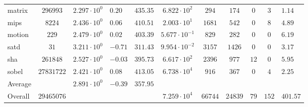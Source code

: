\begin{tabular}{|l|c|HHc|c|c|c|c|cH|}
matrix        & $ 296993   $ & $ 2.297 \cdot 10^{0} $ & $ 0.20  $ & $ 435.35 $ & $ 6.822 \cdot 10^{2}  $ & $ 294   $ & $ 174   $ & $ 0   $ & $ 3   $ & $ 1.14    $ \\
mips          & $ 8224     $ & $ 2.436 \cdot 10^{0} $ & $ 0.06  $ & $ 410.51 $ & $ 2.003 \cdot 10^{1}  $ & $ 1681  $ & $ 542   $ & $ 0   $ & $ 8   $ & $ 4.89    $ \\
motion        & $ 229      $ & $ 2.479 \cdot 10^{0} $ & $ 0.02  $ & $ 403.39 $ & $ 5.677 \cdot 10^{-1} $ & $ 829   $ & $ 282   $ & $ 0   $ & $ 0   $ & $ 6.19    $ \\
satd          & $ 31       $ & $ 3.211 \cdot 10^{0} $ & $ -0.71 $ & $ 311.43 $ & $ 9.954 \cdot 10^{-2} $ & $ 3157  $ & $ 1426  $ & $ 0   $ & $ 0   $ & $ 3.17    $ \\
sha           & $ 261848   $ & $ 2.527 \cdot 10^{0} $ & $ -0.03 $ & $ 395.73 $ & $ 6.617 \cdot 10^{2}  $ & $ 2396  $ & $ 977   $ & $ 12  $ & $ 0   $ & $ 5.95    $ \\
sobel         & $ 27831722 $ & $ 2.421 \cdot 10^{0} $ & $ 0.08  $ & $ 413.05 $ & $ 6.738 \cdot 10^{4}  $ & $ 916   $ & $ 367   $ & $ 0   $ & $ 4   $ & $ 2.25    $ \\
\hline
Average       & $          $ & $ 2.891 \cdot 10^{0} $ & $ -0.39 $ & $ 357.95 $ & $                     $ & $       $ & $       $ & $     $ & $     $ & $         $ \\
\hline
Overall       & $ 29465076 $ & $                    $ & $       $ & $        $ & $ 7.259 \cdot 10^{4}  $ & $ 66744 $ & $ 24839 $ & $ 79  $ & $ 152 $ & $ 401.57  $ \\
\hline
\end{tabular}
